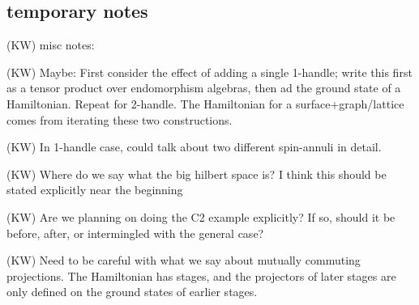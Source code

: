 \documentclass[12pt,a4paper]{article}
\newcounter{arrow}
\newcommand{\tp}{\otimes}
\newcommand{\kw}[1]{{\color{kwcolor}\footnotesize{(KW) #1}}}
\newcommand{\ket}[1]{\ensuremath{\left|#1\right\rangle}}
\newcommand{\dave}[1]{{\color{ao(english)}\footnotesize{(DA) #1}}}
\begin{document}

\subsection{temporary notes}

\kw{misc notes:}

\kw{Maybe: First consider the effect of adding a single 1-handle; write this first as a tensor product over endomorphism
algebras, then ad the ground state of a Hamiltonian.  Repeat for 2-handle.  The Hamiltonian for a surface+graph/lattice
comes from iterating these two constructions.}

\kw{In 1-handle case, could talk about two different spin-annuli in detail.}

\kw{Where do we say what the big hilbert space is?  I think this should be stated explicitly near the beginning}

\kw{Are we planning on doing the C2 example explicitly?  
If so, should it be before, after, or intermingled with the general case?}

\kw{Need to be careful with what we say about mutually commuting projections.
The Hamiltonian has stages, and the projectors of later stages are only defined on the ground
states of earlier stages.}
\end{document}
